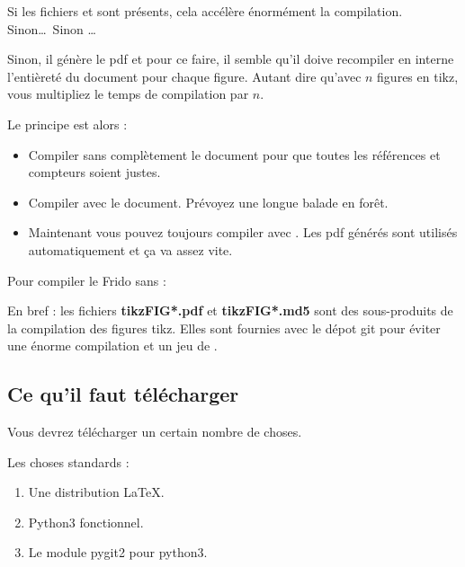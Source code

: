 Si les fichiers  et  sont présents, cela accélère énormément la compilation. Sinon\ldots\ Sinon \ldots

Sinon, il génère le pdf et pour ce faire, il semble qu'il doive recompiler en interne l'entièreté du document pour chaque figure. Autant dire qu'avec \( n\) figures en tikz, vous multipliez le temps de compilation par \( n\).

Le principe est alors :
\begin{itemize}
    \item Compiler sans  complètement le document pour que toutes les références et compteurs soient justes.
    \item Compiler avec  le document. Prévoyez une longue balade en forêt.
    \item Maintenant vous pouvez toujours compiler avec . Les pdf générés sont utilisés automatiquement et ça va assez vite.
\end{itemize}

Pour compiler le Frido sans  :


En bref : les fichiers {\bf tikzFIG*.pdf} et {\bf tikzFIG*.md5} sont des sous-produits de la compilation des figures tikz. Elles sont fournies avec le dépot git pour éviter une énorme compilation et un jeu de .

\subsection{Ce qu'il faut télécharger}

Vous devrez télécharger un certain nombre de choses. 

Les choses standards :
\begin{enumerate}
    \item
        Une distribution \LaTeX.
    \item
        Python3 fonctionnel.
    \item
        Le module pygit2 pour python3.
\end{enumerate}


